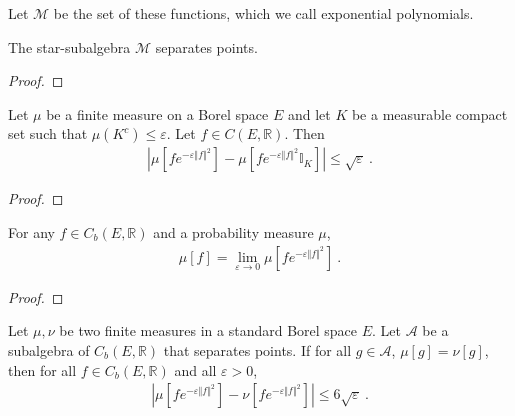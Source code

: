 Let $\mathcal M$ be the set of these functions, which we call exponential polynomials.

\begin{lemma}\label{lem:separates_points_expPoly}
\mathlibok
{}
The star-subalgebra $\mathcal M$ separates points.
\end{lemma}

\begin{proof}\leanok
\end{proof}


\begin{lemma}\label{lem:integral_restrict_compact}
\mathlibok
{}
Let $\mu$ be a finite measure on a Borel space $E$ and let $K$ be a measurable compact set such that $\mu(K^c) \le \varepsilon$. Let $f \in C(E, \mathbb{R})$. Then
\begin{align*}
\left\vert \mu[fe^{-\varepsilon \Vert f \Vert^2}] - \mu[f e^{-\varepsilon \Vert f \Vert^2} \mathbb{I}_K] \right\vert
\le \sqrt{\varepsilon} \: .
\end{align*}
\end{lemma}

\begin{proof}\leanok
\end{proof}


\begin{lemma}\label{lem:introduce_exponential}
\mathlibok
{}
For any $f \in C_b(E, \mathbb{R})$ and a probability measure $\mu$,
\begin{align*}
\mu[f] 
= \lim_{\varepsilon \to 0} \mu\left[f e^{-\varepsilon \Vert f \Vert^2} \right]
\: .
\end{align*}
\end{lemma}

\begin{proof}\leanok
\end{proof}


\begin{lemma}\label{lem:dist_integral_mulExpNegMulSq_comp_le}
\mathlibok
{}
Let $\mu, \nu$ be two finite measures in a standard Borel space $E$. Let $\mathcal{A}$ be a subalgebra of $C_b(E, \mathbb{R})$ that separates points.
If for all $g \in \mathcal A$, $\mu[g] = \nu[g]$, then for all $f \in C_b(E, \mathbb{R})$ and all $\varepsilon > 0$,
\begin{align*}
    \left\vert \mu[fe^{-\varepsilon \Vert f \Vert^2}] - \nu[f e^{-\varepsilon \Vert f \Vert^2}] \right\vert
    \le 6\sqrt{\varepsilon} \: .
\end{align*}
\end{lemma}

